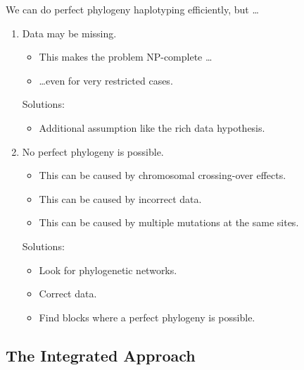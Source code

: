 \documentclass[aspectratio=1610]{beamer}
\begin{document}
\begin{frame}{We can do perfect phylogeny haplotyping efficiently, but
    \dots}
  \begin{enumerate}
  \item \alert{Data may be missing.}
    \begin{itemize}
    \item This makes the problem NP-complete \dots
    \item \dots even for very restricted cases.
    \end{itemize}
    \textcolor{green!50!black}{Solutions:}
    \begin{itemize}
    \item Additional assumption like the rich data hypothesis. 
    \end{itemize}
  \item \alert{No perfect phylogeny is possible.}
    \begin{itemize}
    \item This can be caused by chromosomal crossing-over effects.
    \item This can be caused by incorrect data.
    \item This can be caused by multiple mutations at the same sites.
    \end{itemize}
    \textcolor{green!50!black}{Solutions:}
    \begin{itemize}
    \item Look for phylogenetic networks.
    \item Correct data.
    \item<alert@1->
       Find blocks where a perfect phylogeny is possible.
    \end{itemize}
  \end{enumerate}
\end{frame}


\subsection{The Integrated Approach}
\end{document}
